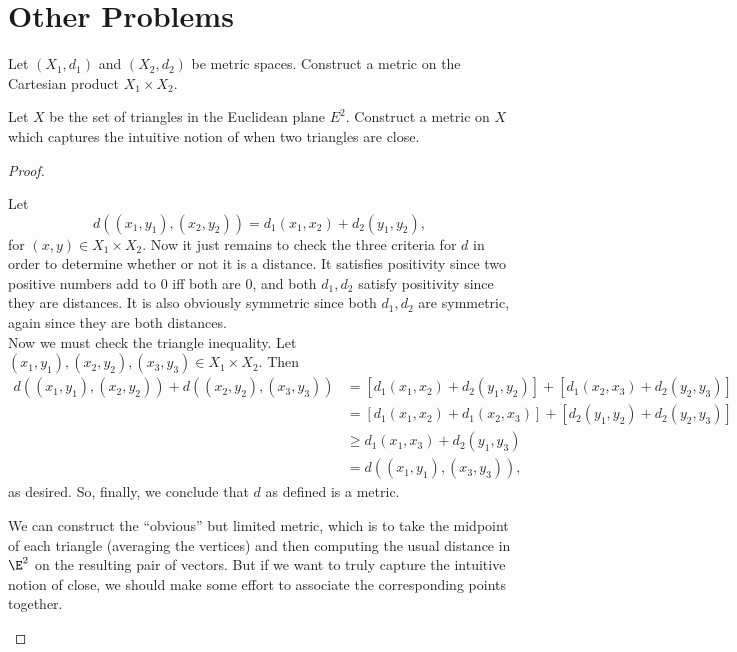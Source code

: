 \documentclass{assignment}
\begin{document}
\section*{Other Problems}
\begin{question}[1]
  \begin{qparts}
    \item Let $(X_1, d_1)$ and $(X_2, d_2)$ be metric spaces. Construct a metric on the Cartesian
product $X_1 \times X_2$.
    \item Let $X$ be the set of triangles in the Euclidean plane $E^2$. Construct a metric on $X$
which captures the intuitive notion of when two triangles are close.  
  \end{qparts}
\end{question}
\begin{proof}\leavevmode
  \begin{qparts}
  \item Let $$d\left((x_1, y_1), (x_2,y_2)\right) = d_1(x_1, x_2) + d_2(y_1, y_2),$$ for $(x,y)\in X_1\times X_2$.
    Now it just remains to check the three criteria for $d$ in order to determine whether or not it is 
    a distance. It satisfies positivity since two positive numbers add to 0 iff both are 0, and both
    $d_1, d_2$ satisfy positivity since they are distances. It is also obviously symmetric since both
    $d_1, d_2$ are symmetric, again since they are both distances. \\

    Now we must check the triangle inequality. Let $(x_1, y_1), (x_2, y_2), (x_3, y_3) \in X_1\times 
    X_2$. Then 
    \begin{align*}
      d\left((x_1, y_1), (x_2, y_2)\right) + d\left((x_2, y_2), (x_3, y_3)\right) &= 
      \left[d_1(x_1, x_2) + d_2(y_1, y_2)\right] + \left[d_1(x_2, x_3) + d_2(y_2, y_3)\right] \\
      &= \left[d_1(x_1,x_2) + d_1(x_2, x_3)\right] + \left[d_2(y_1,y_2) + d_2(y_2, y_3)\right] \\
      &\geq d_1(x_1, x_3) + d_2(y_1, y_3) \\
      &= d((x_1, y_1), (x_3, y_3)),
    \end{align*}
    as desired. So, finally, we conclude that $d$ as defined is a metric.

   \item We can construct the ``obvious'' but limited metric, which is to take the midpoint of each 
     triangle (averaging the vertices) and then computing the usual distance in $\E^2$ on the resulting
     pair of vectors. But if we want to truly capture the intuitive notion of close, we should make
     some effort to associate the corresponding points together. \\


\end{qparts}
\end{proof}
\end{document}
